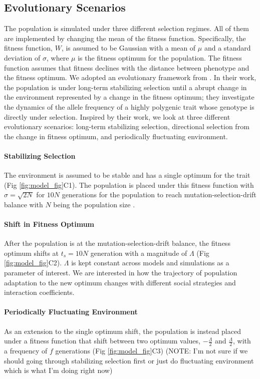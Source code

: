 \documentclass{article}
\begin{document}
\subsection{Evolutionary Scenarios}

The population is simulated under three different selection regimes. All of them are implemented by changing the mean of the fitness function. Specifically, the fitness function, $W$, is assumed to be Gaussian with a mean of $\mu$ and a standard deviation of $\sigma$, where $\mu$ is the fitness optimum for the population. The fitness function assumes that fitness declines with the distance between phenotype and the fitness optimum. We adopted an evolutionary framework from \cite{Hayward2022}. In their work, the population is under long-term stabilizing selection until a abrupt change in the environment represented by a change in the fitness optimum; they investigate the dynamics of the allele frequency of a highly polygenic trait whose genotype is directly under selection. Inspired by their work, we look at three different evolutionary scenarios: long-term stabilizing selection, directional selection from the change in fitness optimum, and periodically fluctuating environment. 

\paragraph{Stabilizing Selection} The environment is assumed to be stable and has a single optimum for the trait (Fig \ref{fig:model_fig}C1). The population is placed under this fitness function with $\sigma=\sqrt{2N}$ for $10N$ generations for the population to reach mutation-selection-drift balance with $N$ being the population size \cite{Hayward2022}. 

\paragraph{Shift in Fitness Optimum} After the population is at the mutation-selection-drift balance, the fitness optimum shifts at $t_s=10N$ generation with a magnitude of $\Lambda$ (Fig \ref{fig:model_fig}C2). $\Lambda$ is kept constant across models and simulations as a parameter of interest. We are interested in how the trajectory of population adaptation to the new optimum changes with different social strategies and interaction coefficients.

\paragraph{Periodically Fluctuating Environment} As an extension to the single optimum shift, the population is instead placed under a fitness function that shift between two optimum values, $-\frac{\Lambda}{2}$ and $\frac{\Lambda}{2}$, with a frequency of $f$ generations (Fig \ref{fig:model_fig}C3) (NOTE: I'm not sure if we should going through stabilizing selection first or just do fluctuating environment which is what I'm doing right now)
\end{document}
